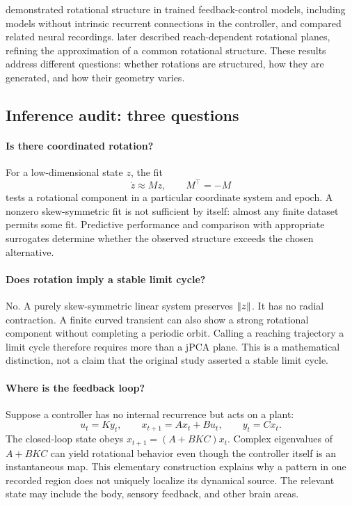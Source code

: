 \citet{ev_kalidindi2021} demonstrated rotational structure in trained feedback-control models, including models without intrinsic recurrent connections in the controller, and compared related neural recordings. \citet{ev_sabatini2024} later described reach-dependent rotational planes, refining the approximation of a common rotational structure. These results address different questions: whether rotations are structured, how they are generated, and how their geometry varies.

\subsection{Inference audit: three questions}
\paragraph{Is there coordinated rotation?}
For a low-dimensional state \(z\), the fit
\[
\dot z\approx Mz,\qquad M^\top=-M
\]
tests a rotational component in a particular coordinate system and epoch. A nonzero skew-symmetric fit is not sufficient by itself: almost any finite dataset permits some fit. Predictive performance and comparison with appropriate surrogates determine whether the observed structure exceeds the chosen alternative.

\paragraph{Does rotation imply a stable limit cycle?}
No. A purely skew-symmetric linear system preserves \(\left\lVert z\right\rVert\). It has no radial contraction. A finite curved transient can also show a strong rotational component without completing a periodic orbit. Calling a reaching trajectory a limit cycle therefore requires more than a jPCA plane. This is a mathematical distinction, not a claim that the original study asserted a stable limit cycle.

\paragraph{Where is the feedback loop?}
Suppose a controller has no internal recurrence but acts on a plant:
\[
u_t=K y_t,\qquad x_{t+1}=A x_t+B u_t,\qquad y_t=Cx_t.
\]
The closed-loop state obeys \(x_{t+1}=(A+BKC)x_t\). Complex eigenvalues of \(A+BKC\) can yield rotational behavior even though the controller itself is an instantaneous map. This elementary construction explains why a pattern in one recorded region does not uniquely localize its dynamical source. The relevant state may include the body, sensory feedback, and other brain areas.

